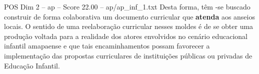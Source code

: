 \begin{textsample}{POS Dim 2 – ap – Score 22.00 – ap/ap\_inf\_1.txt}
Desta forma, têm -se buscado construir de forma colaborativa um documento curricular que \textbf{atenda} aos anseios locais.
O sentido de uma reelaboração curricular nesses moldes é de se obter uma produção voltada para a realidade dos atores envolvidos no cenário educacional infantil amapaense e que tais encaminhamentos possam favorecer a implementação das propostas curriculares de instituições públicas ou privadas de Educação Infantil.

\end{textsample}
